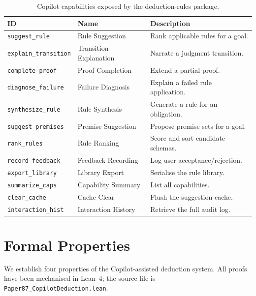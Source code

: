 \documentclass[11pt]{article}
\begin{document}
\begin{table}[t]
\centering
\caption{Copilot capabilities exposed by the deduction-rules package.}
\label{tab:capabilities}
\begin{tabular}{@{}llp{4.5cm}@{}}
\hline
\textbf{ID} & \textbf{Name} & \textbf{Description} \\
\hline
\texttt{suggest\_rule}
  & Rule Suggestion
  & Rank applicable rules for a goal. \\
\texttt{explain\_transition}
  & Transition Explanation
  & Narrate a judgment transition. \\
\texttt{complete\_proof}
  & Proof Completion
  & Extend a partial proof. \\
\texttt{diagnose\_failure}
  & Failure Diagnosis
  & Explain a failed rule application. \\
\texttt{synthesize\_rule}
  & Rule Synthesis
  & Generate a rule for an obligation. \\
\texttt{suggest\_premises}
  & Premise Suggestion
  & Propose premise sets for a goal. \\
\texttt{rank\_rules}
  & Rule Ranking
  & Score and sort candidate schemas. \\
\texttt{record\_feedback}
  & Feedback Recording
  & Log user acceptance/rejection. \\
\texttt{export\_library}
  & Library Export
  & Serialise the rule library. \\
\texttt{summarize\_caps}
  & Capability Summary
  & List all capabilities. \\
\texttt{clear\_cache}
  & Cache Clear
  & Flush the suggestion cache. \\
\texttt{interaction\_hist}
  & Interaction History
  & Retrieve the full audit log. \\
\hline
\end{tabular}
\end{table}


\section{Formal Properties}\label{sec:formal}

We establish four properties of the Copilot-assisted deduction
system.  All proofs have been mechanised in Lean~4; the source
file is \texttt{Paper87\_CopilotDeduction.lean}.
\end{document}
